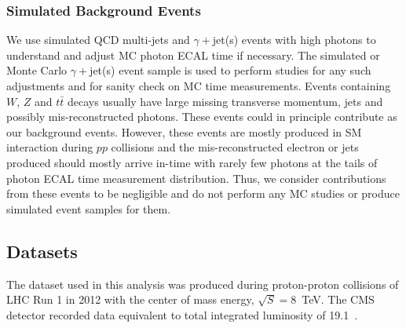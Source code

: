 \subsubsection*{Simulated Background Events}
We use simulated QCD multi-jets and $\gamma +$jet(s) events with high \pt photons to understand and adjust MC photon ECAL time if necessary. The simulated or Monte Carlo $\gamma +$jet(s) event sample is used to perform studies for any such adjustments and for sanity check on MC time measurements. 
\newline
Events containing $W$, $Z$ and $t\bar{t}$  decays usually have large missing transverse momentum, jets and possibly mis-reconstructed photons. These events could in principle contribute as our background events. However, these events are mostly produced in SM interaction during $pp$ collisions and the mis-reconstructed electron or jets produced should mostly arrive in-time with rarely few photons at the tails of photon ECAL time measurement distribution. Thus, we consider contributions from these events  to be negligible and do not perform any MC studies or produce simulated event samples for them. 
\subsection{Datasets}
The dataset used in this analysis was produced during proton-proton collisions of LHC Run 1 in 2012 with the center of mass energy, $\sqrt{S} = 8$~TeV. The CMS detector recorded data equivalent to total integrated luminosity of 19.1~\fbinv .
